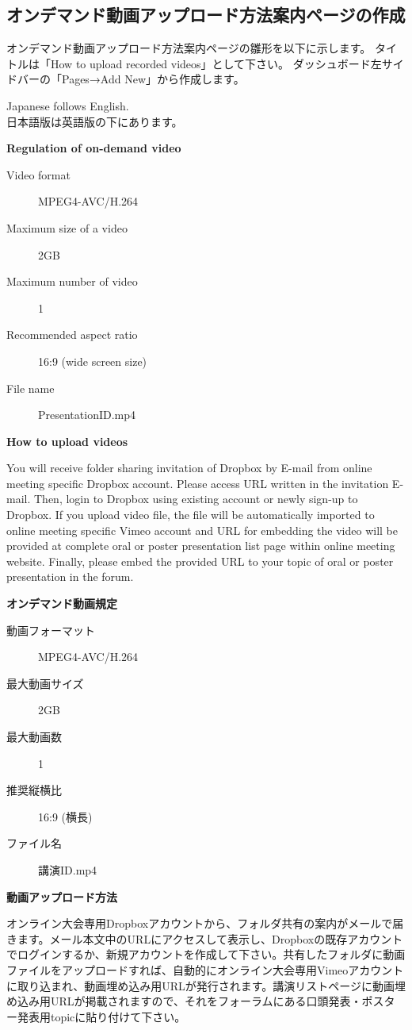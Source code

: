 \documentclass[titlepage,10pt,a4paper,uplatex]{jsbook}
\newenvironment{content}{\begin{shaded}\vspace{-1em}\raggedright\ttfamily\footnotesize\setlength{\baselineskip}{1.4em}}{\end{shaded}\vspace{-1em}}
\renewcommand{\textbf}[1]{{\bfseries\sffamily#1}}
\begin{document}
\subsection{オンデマンド動画アップロード方法案内ページの作成}

オンデマンド動画アップロード方法案内ページの雛形を以下に示します。
タイトルは「How to upload recorded videos」として下さい。
ダッシュボード左サイドバーの「Pages→Add New」から作成します。

\begin{content}
Japanese follows English.\\
日本語版は英語版の下にあります。

\textbf{\Large Regulation of on-demand video}

\begin{description}
\item[Video format] MPEG4-AVC/H.264
\item[Maximum size of a video] 2GB
\item[Maximum number of video] 1
\item[Recommended aspect ratio] 16:9 (wide screen size)
\item[File name] PresentationID.mp4
\end{description}

\textbf{\Large How to upload videos}

You will receive folder sharing invitation of Dropbox by E-mail from online meeting specific Dropbox account. Please access URL written in the invitation E-mail. Then, login to Dropbox using existing account or newly sign-up to Dropbox. If you upload video file, the file will be automatically imported to online meeting specific Vimeo account and URL for embedding the video will be provided at complete oral or poster presentation list page within online meeting website. Finally, please embed the provided URL to your topic of oral or poster presentation in the forum.

\textbf{\Large オンデマンド動画規定}

\begin{description}
\item[動画フォーマット] MPEG4-AVC/H.264
\item[最大動画サイズ] 2GB
\item[最大動画数] 1
\item[推奨縦横比] 16:9 (横長)
\item[ファイル名] 講演ID.mp4
\end{description}

\textbf{\Large 動画アップロード方法}

オンライン大会専用Dropboxアカウントから、フォルダ共有の案内がメールで届きます。メール本文中のURLにアクセスして表示し、Dropboxの既存アカウントでログインするか、新規アカウントを作成して下さい。共有したフォルダに動画ファイルをアップロードすれば、自動的にオンライン大会専用Vimeoアカウントに取り込まれ、動画埋め込み用URLが発行されます。講演リストページに動画埋め込み用URLが掲載されますので、それをフォーラムにある口頭発表・ポスター発表用topicに貼り付けて下さい。
\end{content}
\end{document}
